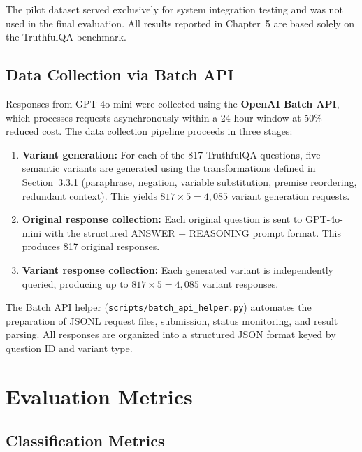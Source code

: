 The pilot dataset served exclusively for system integration testing and was not used in the final evaluation. All results reported in Chapter~5 are based solely on the TruthfulQA benchmark.

\subsection{Data Collection via Batch API}

Responses from GPT-4o-mini were collected using the \textbf{OpenAI Batch API}, which processes requests asynchronously within a 24-hour window at 50\% reduced cost. The data collection pipeline proceeds in three stages:

\begin{enumerate}
    \item \textbf{Variant generation:} For each of the 817 TruthfulQA questions, five semantic variants are generated using the transformations defined in Section~3.3.1 (paraphrase, negation, variable substitution, premise reordering, redundant context). This yields $817 \times 5 = 4{,}085$ variant generation requests.

    \item \textbf{Original response collection:} Each original question is sent to GPT-4o-mini with the structured ANSWER + REASONING prompt format. This produces 817 original responses.

    \item \textbf{Variant response collection:} Each generated variant is independently queried, producing up to $817 \times 5 = 4{,}085$ variant responses.
\end{enumerate}

The Batch API helper (\texttt{scripts/batch\_api\_helper.py}) automates the preparation of JSONL request files, submission, status monitoring, and result parsing. All responses are organized into a structured JSON format keyed by question ID and variant type.

\section{Evaluation Metrics}
\label{sec:eval-metrics}

\subsection{Classification Metrics}

